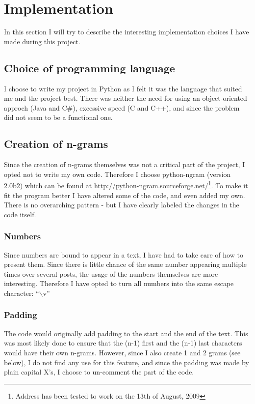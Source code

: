 \section{Implementation}
\label{implementation}

In this section I will try to describe the interesting implementation choices I have made during this project.

\subsection{Choice of programming language}
I choose to write my project in Python as I felt it was the language that suited me and the project best. There was neither the need for using an object-oriented approch (Java and C\#), excessive speed (C and C++), and since the problem did not seem to be a functional one.

\subsection{Creation of n-grams}
Since the creation of n-grams themselves was not a critical part of the project, I opted not to write my own code. Therefore I choose python-ngram (version 2.0b2) which can be found at http://python-ngram.sourceforge.net/\footnote{Address has been tested to work on the 13th of August, 2009}. To make it fit the program better I have altered some of the code, and even added my own. There is no overarching pattern - but I have clearly labeled the changes in the code itself.
\subsubsection*{Numbers}
Since numbers are bound to appear in a text, I have had to take care of how to present them. Since there is little chance of the same number appearing multiple times over several posts, the usage of the numbers themselves are more interesting. Therefore I have opted to turn all numbers into the same escape character: ``$\backslash$v''
\subsubsection*{Padding}
The code would originally add padding to the start and the end of the text. This was most likely done to ensure that the (n-1) first and the (n-1) last characters would have their own n-grams. However, since I also create 1 and 2 grams (see below), I do not find any use for this feature, and since the padding was made by plain capital X's, I choose to un-comment the part of the code.

